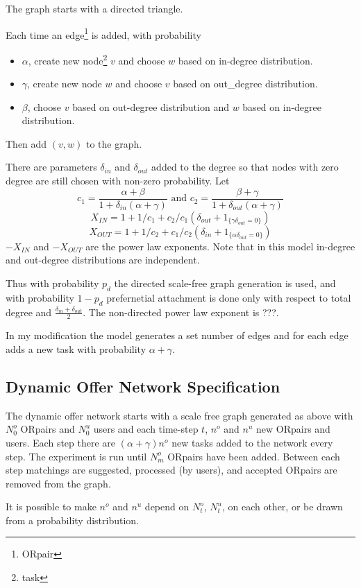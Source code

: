 \documentclass[main.tex]{subfiles}
\begin{document}
The graph starts with a directed triangle.

Each time an edge\footnote{ORpair} is added, with probability
\begin{itemize}
  \item $\alpha$, create new node\footnote{task} $v$ and choose $w$ based on in-degree distribution.
  \item $\gamma$, create new node $w$ and choose $v$ based on out\_degree distribution.
  \item $\beta$, choose $v$ based on out-degree distribution and $w$ based on in-degree distribution.
\end{itemize}
Then add $(v,w)$ to the graph.

There are parameters $\delta_{in}$ and $\delta_{out}$ added to the degree so that nodes with zero degree are still chosen with non-zero probability. Let
$$c_1 = \frac{\alpha + \beta}{1 + \delta_{in}(\alpha + \gamma)} \mbox{ and } c_2 = \frac{\beta + \gamma}{1 + \delta_{out}(\alpha + \gamma)}$$
$$X_{IN} = 1 + 1/c_1 + c_2/c_1(\delta_{out} + 1_{\{\gamma \delta_{out}=0\}})$$
$$X_{OUT} = 1 + 1/c_2 + c_1/c_2(\delta_{in} + 1_{\{\alpha \delta_{out}=0\}})$$
$-X_{IN}$ and $-X_{OUT}$ are the power law exponents. Note that in this model in-degree and out-degree distributions are independent.

Thus with probability $p_d$ the directed scale-free graph generation is used, and with probability $1-p_d$ prefernetial attachment is done only with respect to total degree and $\frac{\delta_{in} + \delta_{out}}{2}$. The non-directed power law exponent is ???.

In my modification the model generates a set number of edges and for each edge adds a new task with probability $\alpha + \gamma$.

\subsection{Dynamic Offer Network Specification}
The dynamic offer network starts with a scale free graph generated as above with $N^o_0$ ORpairs and $N^u_0$ users and each time-step $t$, $n^o$ and $n^u$ new ORpairs and users. Each step there are $(\alpha + \gamma) n^o$ new tasks added to the network every step. The experiment is run until $N^o_m$ ORpairs have been added. Between each step matchings are suggested, processed (by users), and accepted ORpairs are removed from the graph.

It is possible to make $n^o$ and $n^u$ depend on $N^o_t$, $N^u_t$, on each other, or be drawn from a probability distribution.
\end{document}
